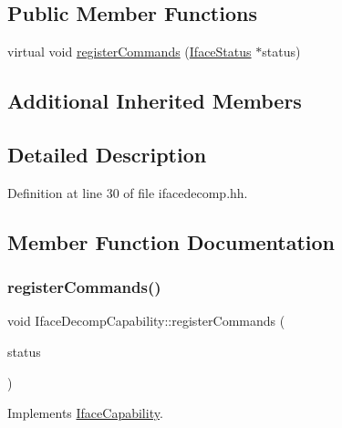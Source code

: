 \subsection*{Public Member Functions}
\begin{DoxyCompactItemize}
\item 
virtual void \mbox{\hyperlink{class_iface_decomp_capability_a9812c0648c6f50b11fccf2d262059f40}{register\+Commands}} (\mbox{\hyperlink{class_iface_status}{Iface\+Status}} $\ast$status)
\end{DoxyCompactItemize}
\subsection*{Additional Inherited Members}


\subsection{Detailed Description}


Definition at line 30 of file ifacedecomp.\+hh.



\subsection{Member Function Documentation}
\mbox{\label{class_iface_decomp_capability_a9812c0648c6f50b11fccf2d262059f40}} 
\subsubsection{\texorpdfstring{registerCommands()}{registerCommands()}}
{\footnotesize\ttfamily void Iface\+Decomp\+Capability\+::register\+Commands (\begin{DoxyParamCaption}\item[{\mbox{\hyperlink{class_iface_status}{Iface\+Status}} $\ast$}]{status }\end{DoxyParamCaption})\hspace{0.3cm}{\ttfamily [virtual]}}



Implements \mbox{\hyperlink{class_iface_capability_a8ed0987e781e5213db777be93e85af6e}{Iface\+Capability}}.



